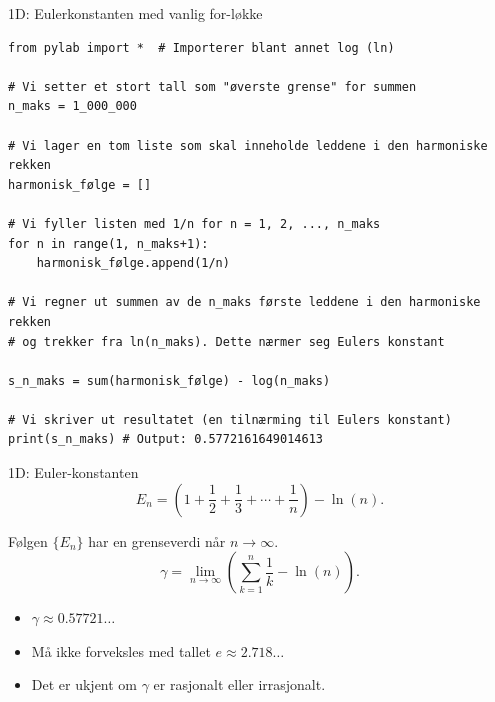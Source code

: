 \cyanheader
\begin{frame}[fragile]{1D: Eulerkonstanten med vanlig for-løkke}
\begin{verbatim}
from pylab import *  # Importerer blant annet log (ln)

# Vi setter et stort tall som "øverste grense" for summen
n_maks = 1_000_000  

# Vi lager en tom liste som skal inneholde leddene i den harmoniske rekken
harmonisk_følge = []  

# Vi fyller listen med 1/n for n = 1, 2, ..., n_maks
for n in range(1, n_maks+1):
    harmonisk_følge.append(1/n)

# Vi regner ut summen av de n_maks første leddene i den harmoniske rekken
# og trekker fra ln(n_maks). Dette nærmer seg Eulers konstant

s_n_maks = sum(harmonisk_følge) - log(n_maks)

# Vi skriver ut resultatet (en tilnærming til Eulers konstant)
print(s_n_maks) # Output: 0.5772161649014613
\end{verbatim}
\end{frame}

\redheader
\begin{frame}{1D: Euler-konstanten}
\[
E_n = \left(1 + \frac{1}{2} + \frac{1}{3} + \cdots + \frac{1}{n}\right) - \ln(n).
\]

\medskip
Følgen $\{E_n\}$ har en grenseverdi når $n \to \infty$.\\
\[
\gamma = \lim_{n \to \infty} \left( \sum_{k=1}^n \frac{1}{k} - \ln(n) \right).
\]

\medskip
\begin{itemize}
  \item $\gamma \approx 0.57721\ldots$\\
  \item Må ikke forveksles med tallet $e \approx 2.718\ldots$\\
  \item Det er ukjent om $\gamma$ er rasjonalt eller irrasjonalt.\\
\end{itemize}
\end{frame}


